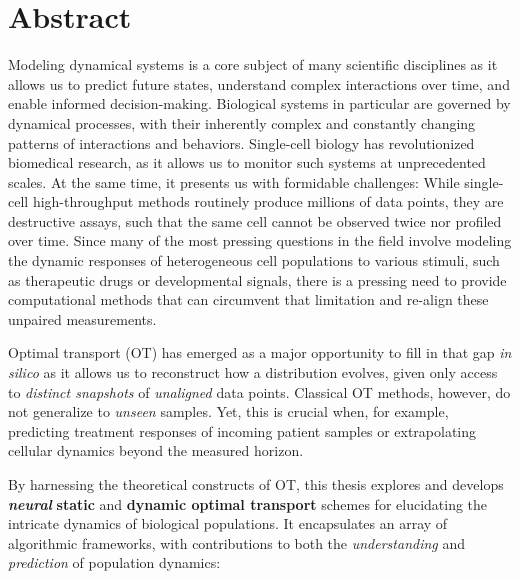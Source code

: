 \begingroup
\let\clearpage\relax
\let\cleardoublepage\relax
\let\cleardoublepage\relax

\chapter*{Abstract}

Modeling dynamical systems is a core subject of many scientific disciplines as it allows us to predict future states, understand complex interactions over time, and enable informed decision-making.
Biological systems in particular are governed by dynamical processes, with their inherently complex and constantly changing patterns of interactions and behaviors.
Single-cell biology has revolutionized biomedical research, as it allows us to monitor such systems at unprecedented scales.
At the same time, it presents us with formidable challenges: While single-cell high-throughput methods routinely produce millions of data points, they are destructive assays, such that the same cell cannot be observed twice nor profiled over time.
Since many of the most pressing questions in the field involve modeling the dynamic responses of heterogeneous cell populations to various stimuli, such as therapeutic drugs or developmental signals, there is a pressing need to provide computational methods that can circumvent that limitation and re-align these unpaired measurements.

Optimal transport (OT) has emerged as a major opportunity to fill in that gap \textit{in silico} as it allows us to reconstruct how a distribution evolves, given only access to \emph{distinct snapshots} of \emph{unaligned} data points.
Classical OT methods, however, do not generalize to \emph{unseen} samples. Yet, this is crucial when, for example, predicting treatment responses of incoming patient samples or extrapolating cellular dynamics beyond the measured horizon.

By harnessing the theoretical constructs of OT, this thesis explores and develops \textbf{\emph{neural}} \textbf{static} and \textbf{dynamic optimal transport} schemes for elucidating the intricate dynamics of biological populations. It encapsulates an array of algorithmic frameworks, with contributions to both the \textit{understanding} and \textit{prediction} of population dynamics:

